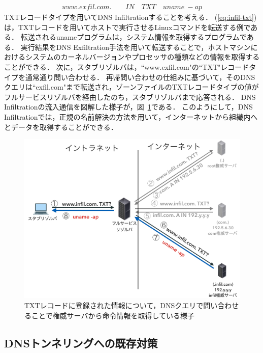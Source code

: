 \begin{eqnarray}
 www.exfil.com. \qquad IN \quad TXT \quad uname \ -ap
 \label{eq:infil-txt}
\end{eqnarray}
TXTレコードタイプを用いてDNS Infiltrationすることを考える．
(\ref{eq:infil-txt})は，TXTレコードを用いてホストで実行させるLinuxコマンドを転送する例である．
転送されるunameプログラムは，システム情報を取得するプログラムである．
実行結果をDNS Exfiltration手法を用いて転送することで，ホストマシンにおけるシステムのカーネルバージョンやプロセッサの種類などの情報を取得することができる．
次に，スタブリゾルバは，``www.exfil.com"の``TXT"レコードタイプを通常通り問い合わせる．
再帰問い合わせの仕組みに基づいて，そのDNSクエリは``exfil.com"まで転送され，ゾーンファイルのTXTレコードタイプの値がフルサービスリゾルバを経由したのち，スタブリゾルバまで応答される．
DNS Infiltrationの流入通信を図解した様子が，図~\ref{fig:dns-infiltration}である．
このようにして，DNS Infiltrationでは，正規の名前解決の方法を用いて，インターネットから組織内へとデータを取得することができる．
\begin{figure}[htbp]
 \centering
 \includegraphics[scale=0.5]{figure/dns-infiltration.png}
 \caption[DNS Infiltrationの概略図]{TXTレコードに登録された情報について，DNSクエリで問い合わせることで権威サーバから命令情報を取得している様子}
 \label{fig:dns-infiltration}
\end{figure}



\newpage
\subsection{DNSトンネリングへの既存対策}

